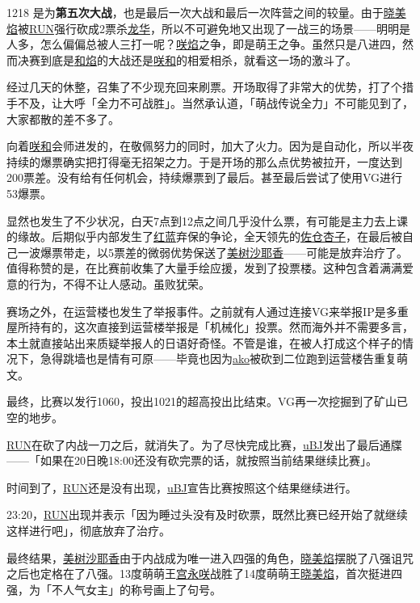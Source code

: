 1218 是为\textbf{第五次大战}，也是最后一次大战和最后一次阵营之间的较量。由于\uline{晓美焰}被\uline{RUN}强行砍成2票杀\uline{龙华}，所以不可避免地又出现了一战三的场景——明明是人多，怎么偏偏总被人三打一呢？\uline{咲焰}之争，即是萌王之争。虽然只是八进四，然而决赛到底是\uline{和焰}的大战还是\uline{咲}\uline{和}的相爱相杀，就看这一场的激斗了。

经过几天的休整，召集了不少现充回来刷票。开场取得了非常大的优势，打了个措手不及，让大呼「全力不可战胜」。当然承认道，「萌战传说全力」不可能见到了，大家都散的差不多了。

向着\uline{咲}\uline{和}会师进发的，在敬佩努力的同时，加大了火力。因为是自动化，所以半夜持续的爆票确实把打得毫无招架之力。于是开场的那么点优势被拉开，一度达到200票差。没有给有任何机会，持续爆票到了最后。甚至最后尝试了使用VG进行53爆票。

显然也发生了不少状况，白天7点到12点之间几乎没什么票，有可能是主力去上课的缘故。后期似乎内部发生了\uline{红蓝}弃保的争论，全天领先的\uline{佐仓杏子}，在最后被自己一波爆票带走，以5票差的微弱优势保送了\uline{美树沙耶香}——可能是放弃治疗了。值得称赞的是，在比赛前收集了大量手绘应援，发到了投票楼。这种包含着满满爱意的行为，不得不让人感动。虽败犹荣。

赛场之外，在运营楼也发生了举报事件。之前就有人通过连接VG来举报IP是多重屋所持有的，这次直接到运营楼举报是「机械化」投票。然而海外并不需要多言，本土就直接站出来质疑举报人的日语好奇怪。不管是谁，在被人打成这个样子的情况下，急得跳墙也是情有可原——毕竟也因为\uline{ako}被砍到二位跑到运营楼告重复萌文。

最终，比赛以发行1060，投出1021的超高投出比结束。VG再一次挖掘到了矿山已空的地步。

\uline{RUN}在砍了内战一刀之后，就消失了。为了尽快完成比赛，\uline{uBJ}发出了最后通牒——「如果在20日晚18:00还没有砍完票的话，就按照当前结果继续比赛」。

时间到了，\uline{RUN}还是没有出现，\uline{uBJ}宣告比赛按照这个结果继续进行。

23:20，\uline{RUN}出现并表示「因为睡过头没有及时砍票，既然比赛已经开始了就继续这样进行吧」，彻底放弃了治疗。

最终结果，\uline{美树沙耶香}由于内战成为唯一进入四强的角色，\uline{晓美焰}摆脱了八强诅咒之后也定格在了八强。13度萌萌王\uline{宫永咲}战胜了14度萌萌王\uline{晓美焰}，首次挺进四强，为「不人气女主」的称号画上了句号。

